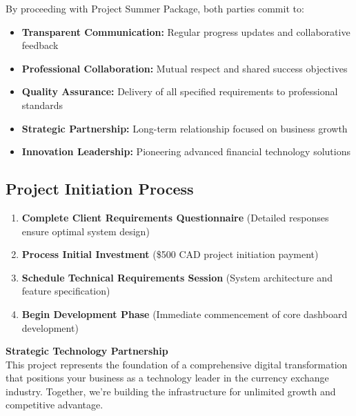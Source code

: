 \documentclass[11pt, letterpaper]{article}
\begin{document}
By proceeding with Project Summer Package, both parties commit to:

\begin{itemize}[leftmargin=*]
    \item \textbf{Transparent Communication:} Regular progress updates and collaborative feedback
    \item \textbf{Professional Collaboration:} Mutual respect and shared success objectives
    \item \textbf{Quality Assurance:} Delivery of all specified requirements to professional standards
    \item \textbf{Strategic Partnership:} Long-term relationship focused on business growth
    \item \textbf{Innovation Leadership:} Pioneering advanced financial technology solutions
\end{itemize}

\subsection{Project Initiation Process}

\begin{tcolorbox}[colback=successGreen!10, colframe=successGreen, title=\textbf{Immediate Action Items}]
\begin{enumerate}
    \item \textbf{Complete Client Requirements Questionnaire} (Detailed responses ensure optimal system design)
    \item \textbf{Process Initial Investment} (\$500 CAD project initiation payment)
    \item \textbf{Schedule Technical Requirements Session} (System architecture and feature specification)
    \item \textbf{Begin Development Phase} (Immediate commencement of core dashboard development)
\end{enumerate}
\end{tcolorbox}

\vspace{1cm}

\begin{center}
\begin{tcolorbox}[colback=techBlue!10, colframe=techBlue, width=0.9\textwidth]
\centering
\textbf{\large Strategic Technology Partnership}\\[0.3cm]
This project represents the foundation of a comprehensive digital transformation that positions your business as a technology leader in the currency exchange industry. Together, we're building the infrastructure for unlimited growth and competitive advantage.
\end{tcolorbox}
\end{center}
\end{document}

